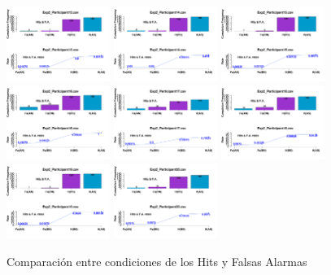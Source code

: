 \begin{figure}[th]
\includegraphics[width=0.30\textwidth]{Figures/MirrorRate_Exp2_P13} \includegraphics[width=0.30\textwidth]{Figures/MirrorRate_Exp2_P14} \includegraphics[width=0.30\textwidth]{Figures/MirrorRate_Exp2_P15}
\includegraphics[width=0.30\textwidth]{Figures/MirrorRate_Exp2_P16} \includegraphics[width=0.30\textwidth]{Figures/MirrorRate_Exp2_P17} \includegraphics[width=0.30\textwidth]{Figures/MirrorRate_Exp2_P18}
\includegraphics[width=0.30\textwidth]{Figures/MirrorRate_Exp2_P19} \includegraphics[width=0.30\textwidth]{Figures/MirrorRate_Exp2_P20} 
\caption[Rate_Exp2]{Comparación entre condiciones de los Hits y Falsas Alarmas}
\label{fig:Rate_E2}
\end{figure}

